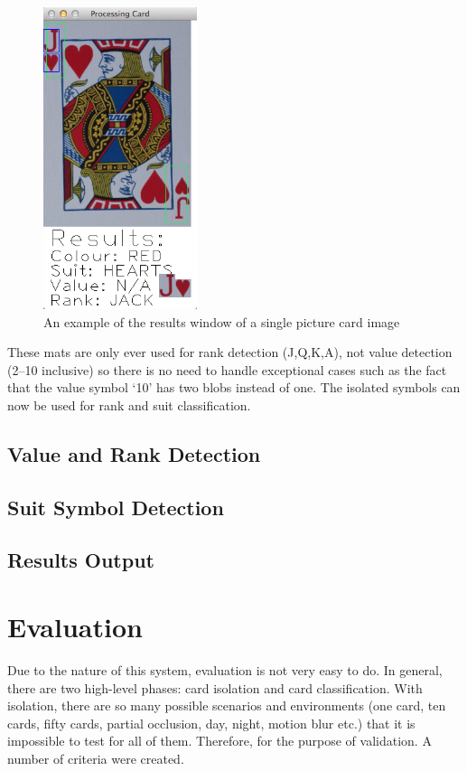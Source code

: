 \documentclass[a4paper,12pt,notitlepage]{article}
\begin{document}
		\begin{figure}[H]
			\centering
			\includegraphics[width=0.4\textwidth]{symfind}
			\caption{An example of the results window of a single picture card image}
			\label{fig:symfind}
		\end{figure}

		These mats are only ever used for rank detection (J,Q,K,A), not value detection (2--10 inclusive) so there is no need to handle exceptional cases such as the fact that the value symbol `10' has two blobs instead of one. The isolated symbols can now be used for rank and suit classification.
	\subsection{Value and Rank Detection}
		\label{sec:numdet}
		
	\subsection{Suit Symbol Detection}
		
	\subsection{Results Output}
		\label{sec:resultsout}
		
\pagebreak
\section{Evaluation}
	Due to the nature of this system, evaluation is not very easy to do. In general, there are two high-level phases: card isolation and card classification. With isolation, there are so many possible scenarios and environments (one card, ten cards, fifty cards, partial occlusion, day, night, motion blur etc.) that it is impossible to test for all of them. Therefore, for the purpose of validation. A number of criteria were created.
\end{document}
